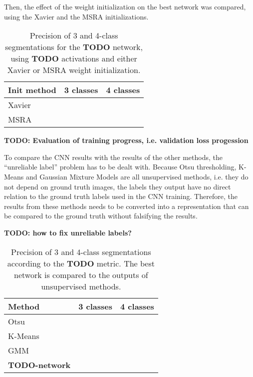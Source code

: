 \noindent Then, the effect of the weight initialization on the best network was compared, using the Xavier and the MSRA initializations.

\begin {table}
	\centering
	\begin {tabular}[!ht]{|l|c|c|}
		\hline
		\textbf{Init method}& \textbf{3 classes}& \textbf{4 classes}\\ \hline
		Xavier& & \\ \hline
		MSRA& & \\ \hline
	\end {tabular}
\caption[]{Precision of 3 and 4-class segmentations for the \textbf{TODO} network, using \textbf{TODO} activations and either Xavier or MSRA weight initialization.}
\end {table}

\textbf{TODO: Evaluation of training progress, i.e. validation loss progession}


To compare the CNN results with the results of the other methods, the ``unreliable label'' problem has to be dealt with. Because Otsu thresholding, K-Means and Gaussian Mixture Models are all unsupervised methods, i.e. they do not depend on ground truth images, the labels they output have no direct relation to the ground truth labels used in the CNN training. Therefore, the results from these methods needs to be converted into a representation that can be compared to the ground truth without falsifying the results.

\textbf{TODO: how to fix unreliable labels?}

\begin {table}
	\centering
	\begin {tabular}[!ht]{|l|c|c|}
		\hline
		\textbf{Method}& \textbf{3 classes}& \textbf{4 classes}\\ \hline
		Otsu& & \\ \hline
		K-Means& & \\ \hline
		GMM& & \\ \hline
		\textbf{TODO-network}& & \\ \hline
	\end {tabular}
\caption[]{Precision of 3 and 4-class segmentations according to the \textbf{TODO} metric. The best network is compared to the outputs of unsupervised methods.}
\end {table}